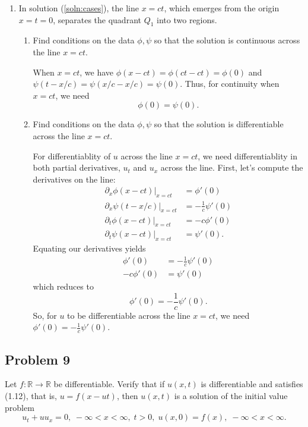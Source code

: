 \documentclass[a4paper,12pt]{article}
\newcommand{\reals}{\mathbb{R}}
\begin{document}
\begin{enumerate}[label = \textbf{(\alph*)}]
        \item In solution (\ref{soln:cases}), the line $ x = ct $, which emerges from the origin $ x = t = 0 $, separates the quadrant $ Q_1 $ into two regions.
        \begin{enumerate}[label = \textbf{(\roman*)}]
            \item Find conditions on the data $ \phi, \psi $ so that the solution is continuous across the line $ x = ct $.
            
            When $ x = ct $, we have $ \phi(x - ct) = \phi(ct - ct) = \phi(0) $ and $ \psi(t - x/c) = \psi(x/c - x/c) = \psi(0)$. Thus, for continuity when $ x = ct $, we need
            \[
                \phi(0) = \psi(0).
            \]
            
            \item Find conditions on the data $ \phi, \psi $ so that the solution is differentiable across the line $ x = ct $.
            
            For differentiablity of $ u $ across the line $ x = ct $, we need differentiablity in both partial derivatives, $ u_t $ and $ u_x $ across the line. First, let's compute the derivatives on the line:
            \begin{align*}
                \left.\partial_x \phi(x - ct)\right\lvert_{x = ct} &= \phi'(0) \\
                \left.\partial_x \psi(t - x/c)\right\lvert_{x = ct} &= -\frac{1}{c}\psi'(0) \\
                \left.\partial_t \phi(x - ct)\right\lvert_{x = ct} &= -c\phi'(0) \\
                \left.\partial_t \psi(x - ct)\right\lvert_{x = ct} &= \psi'(0).
            \end{align*}
            Equating our derivatives yields
            \begin{align*}
                \phi'(0) &= -\frac{1}{c}\psi'(0) \\
                -c\phi'(0) &= \psi'(0)
            \end{align*}
            which reduces to
            \[
                \phi'(0) = -\frac{1}{c}\psi'(0).
            \]
            So, for $ u $ to be differentiable across the line $ x = ct $, we need $ \phi'(0) = -\frac{1}{c}\psi'(0) $.
        \end{enumerate}
    \end{enumerate}

\subsection*{Problem 9}
    Let $ f : \reals \to \reals $ be differentiable. Verify that if $ u(x, t) $ is differentiable and satisfies (1.12), that is, $ u = f(x - ut) $, then $ u(x, t) $ is a solution of the initial value problem
    \[
    	u_t + u u_x = 0, \; -\infty < x < \infty, \; t > 0, \;u(x, 0) = f(x), \; -\infty < x < \infty.
    \]
    
\end{document}
